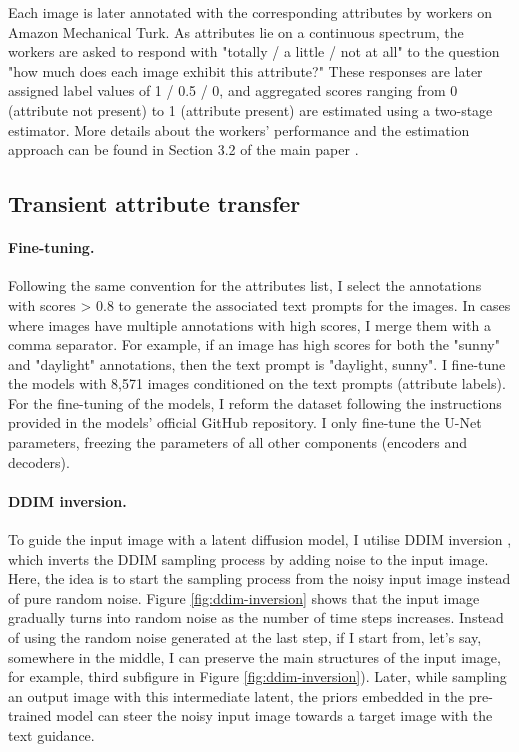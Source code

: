 Each image is later annotated with the corresponding attributes by workers on Amazon Mechanical Turk. As attributes lie on a continuous spectrum, the workers are asked to respond with "totally / a little / not at all" to the question "how much does each image exhibit this attribute?" These responses are later assigned label values of 1 / 0.5 / 0, and aggregated scores ranging from 0 (attribute not present) to 1 (attribute present) are estimated using a two-stage estimator. More details about the workers' performance and the estimation approach can be found in Section 3.2 of the main paper \cite{laffont2014transient}.

\subsection{Transient attribute transfer}

\paragraph{Fine-tuning.} Following the same convention for the attributes list, I select the annotations with scores > 0.8 to generate the associated text prompts for the images. In cases where images have multiple annotations with high scores, I merge them with a comma separator. For example, if an image has high scores for both the "sunny" and "daylight" annotations, then the text prompt is "daylight, sunny". I fine-tune the models with 8,571 images conditioned on the text prompts (attribute labels). For the fine-tuning of the models, I reform the dataset following the instructions provided in the models' official GitHub repository. I only fine-tune the U-Net parameters, freezing the parameters of all other components (encoders and decoders).




\paragraph{DDIM inversion.} To guide the input image with a latent diffusion model, I utilise \gls{DDIM} inversion \cite{dhariwal2021diffusion,song2020denoising} , which inverts the DDIM sampling process by adding noise to the input image. Here, the idea is to start the sampling process from the noisy input image instead of pure random noise. Figure \ref{fig:ddim-inversion} shows that the input image gradually turns into random noise as the number of time steps increases. Instead of using the random noise generated at the last step, if I start from, let’s say, somewhere in the middle, I can preserve the main structures of the input image, for example, third subfigure in Figure  \ref{fig:ddim-inversion}). Later, while sampling an output image with this intermediate latent, the priors embedded in the pre-trained model can steer the noisy input image towards a target image with the text guidance.

